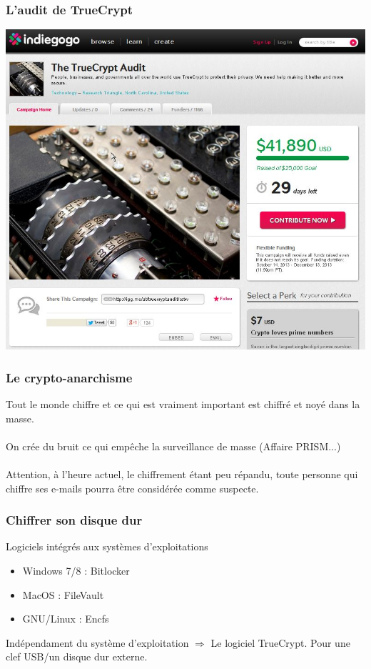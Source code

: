\documentclass{beamer}
\begin{document}
\begin{frame}
\frametitle{L'audit de TrueCrypt}
\begin{center}
 \includegraphics[scale=0.45] {./Illustrations/truecryptaudit.jpg} 
\end{center}
\end{frame}

\begin{frame}
\frametitle{Le crypto-anarchisme}
Tout le monde chiffre et ce qui est vraiment important est chiffré et noyé dans la masse.
\\~\\
On crée du bruit ce qui empêche la surveillance de masse (Affaire PRISM...)
\\~\\
Attention, à l'heure actuel, le chiffrement étant peu répandu, toute personne qui chiffre ses e-mails pourra être considérée comme suspecte.
\end{frame}

\begin{frame}

\frametitle{Chiffrer son disque dur}
\begin{block}{Logiciels intégrés aux systèmes d'exploitations}
\begin{itemize}
\item Windows 7/8 : Bitlocker
\item MacOS : FileVault
\item GNU/Linux : Encfs
\end{itemize}
\end{block}

\begin{block}{Indépendament du système d'exploitation}
$\Rightarrow$ Le logiciel TrueCrypt. Pour une clef USB/un disque dur externe.
\end{block}
\end{frame}
\end{document}
